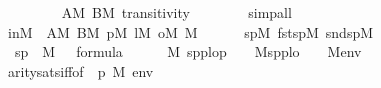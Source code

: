 \begin{isabellebody}
\ \ \ \ \ \ \isamarkupfalse%
\ \ {\isacartoucheopen}A{\isasymin}M{\isacartoucheclose}\ {\isacartoucheopen}B{\isasymin}M{\isacartoucheclose}\ transitivity\isanewline
\ \ \ \ \ \ \isamarkupfalse%
\ simp{\isacharunderscore}{\kern0pt}all\isanewline
\ \ \ \ \isamarkupfalse%
\ inM\ {\isacharequal}{\kern0pt}\ {\isacartoucheopen}A{\isasymin}M{\isacartoucheclose}\ {\isacartoucheopen}B{\isasymin}M{\isacartoucheclose}\ {\isacartoucheopen}p{\isasymin}M{\isacartoucheclose}\ {\isacartoucheopen}l{\isasymin}M{\isacartoucheclose}\ {\isacartoucheopen}o{\isasymin}M{\isacartoucheclose}\ {\isacartoucheopen}{\isasymchi}{\isasymin}M{\isacartoucheclose}\isanewline
\ \ \ \ \ \ {\isacartoucheopen}sp{\isasymin}M{\isacartoucheclose}\ {\isacartoucheopen}fst{\isacharparenleft}{\kern0pt}sp{\isacharparenright}{\kern0pt}{\isasymin}M{\isacartoucheclose}\ {\isacartoucheopen}snd{\isacharparenleft}{\kern0pt}sp{\isacharparenright}{\kern0pt}{\isasymin}M{\isacartoucheclose}\isanewline
\ \ \ \ \isamarkupfalse%
\ {}\ {\isacartoucheopen}sp\ {\isasymin}\ M{\isacartoucheclose}\ {\isacartoucheopen}{\isacharquery}{\kern0pt}{\isasymphi}{\isacharprime}{\kern0pt}\ {\isasymin}\ formula{\isacartoucheclose}\isanewline
\ \ \ \ \isamarkupfalse%
\ {\isachardoublequoteopen}M{\isacharcomma}{\kern0pt}\ {\isacharbrackleft}{\kern0pt}sp{\isacharcomma}{\kern0pt}p{\isacharcomma}{\kern0pt}l{\isacharcomma}{\kern0pt}o{\isacharcomma}{\kern0pt}{\isasymchi}{\isacharbrackright}{\kern0pt}{\isacharat}{\kern0pt}{\isacharbrackleft}{\kern0pt}p{\isacharbrackright}{\kern0pt}\ {\isasymTurnstile}\ {\isacharquery}{\kern0pt}{\isasympsi}\ {\isasymlongleftrightarrow}\ M{\isacharcomma}{\kern0pt}{\isacharbrackleft}{\kern0pt}sp{\isacharcomma}{\kern0pt}p{\isacharcomma}{\kern0pt}l{\isacharcomma}{\kern0pt}o{\isacharcomma}{\kern0pt}{\isasymchi}{\isacharbrackright}{\kern0pt}\ {\isasymTurnstile}\ {\isacharquery}{\kern0pt}{\isasympsi}{\isachardoublequoteclose}\ {\isacharparenleft}{\kern0pt}\ {\isachardoublequoteopen}M{\isacharcomma}{\kern0pt}{\isacharquery}{\kern0pt}env{}{\isacharat}{\kern0pt}\ {\isacharunderscore}{\kern0pt}{\isasymTurnstile}{\isacharunderscore}{\kern0pt}\ {\isasymlongleftrightarrow}\ {\isacharunderscore}{\kern0pt}{\isachardoublequoteclose}{\isacharparenright}{\kern0pt}\isanewline
\ \ \ \ \ \ \isamarkupfalse%
\ arity{\isacharunderscore}{\kern0pt}sats{\isacharunderscore}{\kern0pt}iff{\isacharbrackleft}{\kern0pt}of\ {\isacharquery}{\kern0pt}{\isasympsi}\ {\isachardoublequoteopen}{\isacharbrackleft}{\kern0pt}p{\isacharbrackright}{\kern0pt}{\isachardoublequoteclose}\ M\ {\isacharquery}{\kern0pt}env{}{\isacharbrackright}{\kern0pt}\ \isamarkupfalse%

\end{isabellebody}
